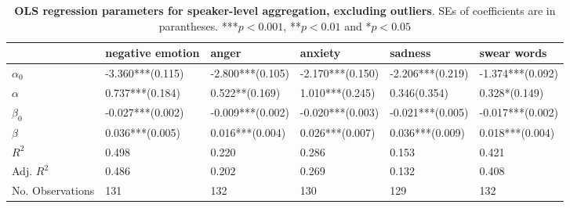 \begin{table}[h]\centering
\caption{\textbf{OLS regression parameters for  speaker-level aggregation, excluding outliers}. SEs of coefficients are in parantheses. ***$p < 0.001$, **$p < 0.01$ and *$p < 0.05$}
	\label{fig: Speaker_2}
\begin{adjustbox}{width=\linewidth, center}
	\begin{tabular}{llllll}
	\toprule
	{} &            negative emotion &                                 anger &                     anxiety &                                                   sadness &                                     swear words \\
	\midrule
	$\alpha_0$       &            -3.360***(0.115) &                      -2.800***(0.105) &            -2.170***(0.150) &                                          -2.206***(0.219) &                                -1.374***(0.092) \\
	$\alpha$         &  \phantom{-}0.737***(0.184) &  \phantom{-}0.522**\phantom{*}(0.169) &  \phantom{-}1.010***(0.245) &  \phantom{-}0.346\phantom{*}\phantom{*}\phantom{*}(0.354) &  \phantom{-}0.328*\phantom{*}\phantom{*}(0.149) \\
	$\beta_0$        &            -0.027***(0.002) &                      -0.009***(0.002) &            -0.020***(0.003) &                                          -0.021***(0.005) &                                -0.017***(0.002) \\
	$\beta$          &  \phantom{-}0.036***(0.005) &            \phantom{-}0.016***(0.004) &  \phantom{-}0.026***(0.007) &                                \phantom{-}0.036***(0.009) &                      \phantom{-}0.018***(0.004) \\
	$R^2$            &                       0.498 &                                 0.220 &                       0.286 &                                                     0.153 &                                           0.421 \\
	Adj. $R^2$       &                       0.486 &                                 0.202 &                       0.269 &                                                     0.132 &                                           0.408 \\
	No. Observations &                         131 &                                   132 &                         130 &                                                       129 &                                             132 \\
	\bottomrule
	\end{tabular}
	
\end{adjustbox}
	\end{table}

